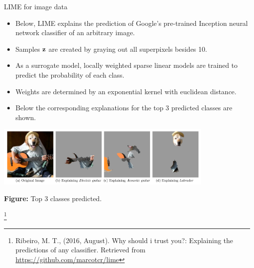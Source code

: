 \documentclass[11pt,compress,t,notes=noshow, aspectratio=169, xcolor=table]{beamer}
\begin{document}
\begin{vbframe}{LIME for image data}
	\begin{itemize}
		\item Below, LIME explains the prediction of Google's pre-trained Inception neural network classifier of an arbitrary image. 
		\item Samples $\zv$ are created by graying out all superpixels besides 10. 
		\item As a surrogate model, locally weighted sparse linear models are trained to predict the probability of each class. 
		\item Weights are determined by an exponential kernel with euclidean distance.
		\item Below the corresponding explanations for the top 3 predicted classes are shown.   
	\end{itemize}
	\vspace{-0.3cm}
	\begin{center}
		\includegraphics[width=0.8\textwidth]{figure/lime-images}
		
		\tiny{\textbf{Figure:} Top 3 classes predicted.}
	\end{center}
	\vspace{-0.3cm}
	\footnote[frame]{Ribeiro, M. T., (2016, August). Why should i trust you?: Explaining the predictions of any classifier. Retrieved from \url{https://github.com/marcotcr/lime}}
\end{vbframe}
\endlecture
\end{document}
